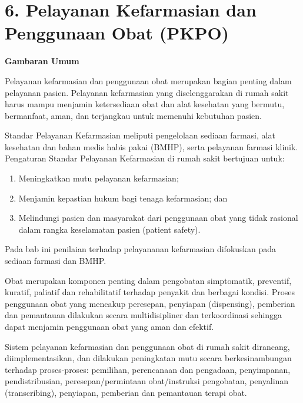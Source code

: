 \documentclass[
]{book}
\providecommand{\tightlist}{%
  \setlength{\itemsep}{0pt}\setlength{\parskip}{0pt}}
\begin{document}
\hypertarget{pelayanan-kefarmasian-dan-penggunaan-obat-pkpo}{%
\section*{6. Pelayanan Kefarmasian dan Penggunaan Obat (PKPO)}\label{pelayanan-kefarmasian-dan-penggunaan-obat-pkpo}}

\textbf{Gambaran Umum}

Pelayanan kefarmasian dan penggunaan obat merupakan bagian penting dalam pelayanan pasien. Pelayanan kefarmasian yang diselenggarakan di rumah sakit harus mampu menjamin ketersediaan obat dan alat kesehatan yang bermutu, bermanfaat, aman, dan terjangkau untuk memenuhi kebutuhan pasien.

Standar Pelayanan Kefarmasian meliputi pengelolaan sediaan farmasi, alat kesehatan dan bahan medis habis pakai (BMHP), serta pelayanan farmasi klinik. Pengaturan Standar Pelayanan Kefarmasian di rumah sakit bertujuan untuk:

\begin{enumerate}
\def\labelenumi{\arabic{enumi}.}
\tightlist
\item
  Meningkatkan mutu pelayanan kefarmasian;
\item
  Menjamin kepastian hukum bagi tenaga kefarmasian; dan
\item
  Melindungi pasien dan masyarakat dari penggunaan obat yang tidak rasional dalam rangka keselamatan pasien (patient safety).
\end{enumerate}

Pada bab ini penilaian terhadap pelayananan kefarmasian difokuskan pada sediaan farmasi dan BMHP.

Obat merupakan komponen penting dalam pengobatan simptomatik, preventif, kuratif, paliatif dan rehabilitatif terhadap penyakit dan berbagai kondisi. Proses penggunaan obat yang mencakup peresepan, penyiapan (dispensing), pemberian dan pemantauan dilakukan secara multidisipliner dan terkoordinasi sehingga dapat menjamin penggunaan obat yang aman dan efektif.

Sistem pelayanan kefarmasian dan penggunaan obat di rumah sakit dirancang, diimplementasikan, dan dilakukan peningkatan mutu secara berkesinambungan terhadap proses-proses: pemilihan, perencanaan dan pengadaan, penyimpanan, pendistribusian, peresepan/permintaan obat/instruksi pengobatan, penyalinan (transcribing), penyiapan, pemberian dan pemantauan terapi obat.
\end{document}
